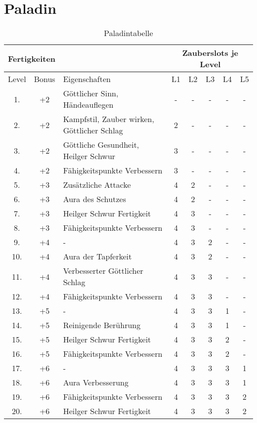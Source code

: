 \documentclass[A4paper, twocolumn]{scrartcl}
\newcommand{\mysubsection}[1]
{
\subsection*{#1}
\addcontentsline{toc}{subsection}{#1}
}
\begin{document}
\twocolumn[\tableofcontents]
\section*{Paladin}
\begin{table*}[t]
\begin{tabular}{c c l | c c c c c}
\multicolumn{3}{l}{Fertigkeiten} & \multicolumn{5}{c}{Zauberslots je Level}\\
\hline
Level 	& Bonus & Eigenschaften 									& L1 & L2 & L3 & L4 & L5 \\
\hline
1.		& +2		& Göttlicher Sinn, Händeauflegen					& - & - & - & - & - \\
2.		& +2		& Kampfstil, Zauber wirken, Göttlicher Schlag	& 2 & - & - & - & - \\
3.		& +2		& Göttliche Gesundheit, Heilger Schwur			& 3 & - & - & - & - \\
4.		& +2		& Fähigkeitspunkte Verbessern					& 3 & - & - & - & - \\
5.		& +3		& Zusätzliche Attacke							& 4 & 2 & - & - & - \\
6.		& +3		& Aura des Schutzes								& 4 & 2 & - & - & - \\
7.		& +3		& Heilger Schwur Fertigkeit						& 4 & 3 & - & - & - \\
8.		& +3		& Fähigkeitspunkte Verbessern					& 4 & 3 & - & - & - \\
9.		& +4		& -												& 4 & 3 & 2 & - & - \\
10.		& +4		& Aura der Tapferkeit							& 4 & 3 & 2 & - & - \\
11.		& +4		& Verbesserter Göttlicher Schlag					& 4 & 3 & 3 & - & - \\
12.		& +4		& Fähigkeitspunkte Verbessern					& 4 & 3 & 3 & - & - \\
13.		& +5		& -												& 4 & 3 & 3 & 1 & - \\
14.		& +5		& Reinigende Berührung							& 4 & 3 & 3 & 1 & - \\
15.		& +5		& Heilger Schwur Fertigkeit						& 4 & 3 & 3 & 2 & - \\
16.		& +5		& Fähigkeitspunkte Verbessern					& 4 & 3 & 3 & 2 & - \\
17.		& +6		& -												& 4 & 3 & 3 & 3 & 1 \\
18.		& +6		& Aura Verbesserung								& 4 & 3 & 3 & 3 & 1 \\
19.		& +6		& Fähigkeitspunkte Verbessern					& 4 & 3 & 3 & 3 & 2 \\
20.		& +6		& Heilger Schwur Fertigkeit						& 4 & 3 & 3 & 3 & 2 \\
\end{tabular}
\caption{Paladintabelle}
\end{table*}
\end{document}
